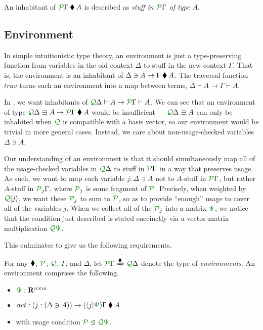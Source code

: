 \documentclass[submission,copyright,creativecommons]{eptcs}
\begin{document}
An inhabitant of $\ctx{\Gamma}{P} \kitrel A$ is described as
\emph{stuff in $\ctx{\Gamma}{P}$ of type $A$}.

\subsection{Environment}

In simple intuitionistic type theory, an environment is just a type-preserving
function from variables in the old context $\Delta$ to stuff in the new context
$\Gamma$.
That is, the environment is an inhabitant of
$\Delta \ni A \to \Gamma \mathbin{\blacklozenge} A$.
The traversal function $\mathit{trav}$ turns such an environment into a map
between terms, $\Delta \vdash A \to \Gamma \vdash A$.

In \name{}, we want inhabitants of
$\ctx{\Delta}{Q} \vdash A \to \ctx{\Gamma}{P} \vdash A$.
We can see that an environment of type
$\ctx{\Delta}{Q} \lvar A \to \ctx{\Gamma}{P} \kitrel A$ would
be insufficient --- $\ctx{\Delta}{Q} \lvar A$ can only be inhabited when
$\resctx Q$ is compatible with a basis vector, so our environment would be
trivial in more general cases.
Instead, we care about non-usage-checked variables $\Delta \ni A$.

Our understanding of an environment is that it should simultaneously map all of
the usage-checked variables in $\ctx{\Delta}{Q}$ to stuff in $\ctx{\Gamma}{P}$
in a way that preserves usage.
As such, we want to map each variable $j : \Delta \ni A$ not to $A$-stuff in
$\ctx{\Gamma}{P}$, but rather $A$-stuff in $\resctx P_j\Gamma$,
where $\resctx P_j$ is some fragment of $\resctx P$.
Precisely, when weighted by $\resctx Q\lvert j \rangle$, we want these
$\resctx P_j$ to sum to $\resctx P$, so as to provide ``enough'' usage to cover
all of the variables $j$.
When we collect all of the $\resctx P_j$ into a matrix $\rescomment\Psi$, we
notice that the condition just described is stated succinctly via a
vector-matrix multiplication $\resctx Q\rescomment\Psi$.

This culminates to give us the following requirements.

\begin{definition}\label{def:env}
  For any $\mathbin{\blacklozenge}$, $\resctx P$, $\resctx Q$, $\Gamma$, and $\Delta$, let
  $\ctx{\Gamma}{P} \subst{\kitrel} \ctx{\Delta}{Q}$ denote the type of
  \emph{environments}.
  An environment comprises the following.
\begin{itemize}
  \item $\rescomment\Psi : \mathbf R^{n \times m}$
  \item $\mathit{act} :
    (j : (\Delta \ni A)) \to (\langle j \rvert\rescomment\Psi)\Gamma \kitrel A$
  \item with usage condition $\resctx P \subres \resctx Q \rescomment\Psi$.
\end{itemize}
\end{definition}
\end{document}
